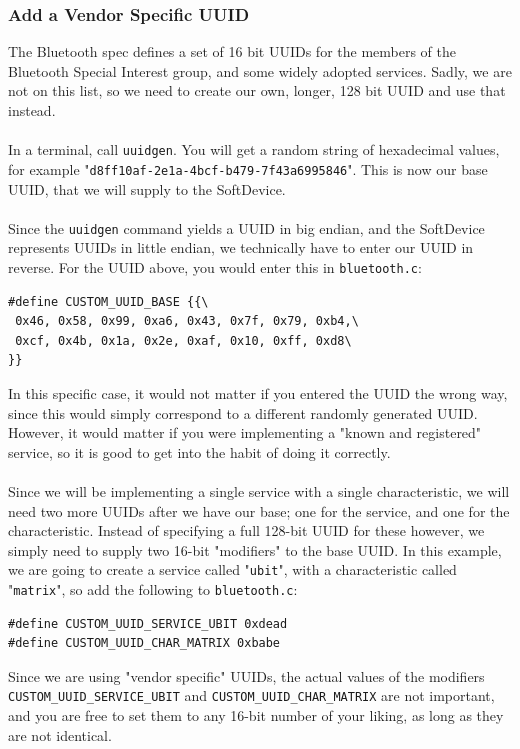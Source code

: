 \documentclass[11pt,a4paper]{article}
\begin{document}
\subsubsection{Add a Vendor Specific UUID}
The Bluetooth spec defines a set of 16 bit UUIDs for the members of the Bluetooth Special Interest group, and some widely adopted services. Sadly, we are not on this list, so we need to create our own, longer, 128 bit UUID and use that instead.\\
\\
In a terminal, call \texttt{uuidgen}. You will get a random string of hexadecimal values, for example "\texttt{d8ff10af-2e1a-4bcf-b479-7f43a6995846}". This is now our base UUID, that we will supply to the SoftDevice.\\
\\
Since the \texttt{uuidgen} command yields a UUID in big endian, and the SoftDevice represents UUIDs in little endian, we technically have to enter our UUID in reverse. For the UUID above, you would enter this in \texttt{bluetooth.c}:
\begin{verbatim}
#define CUSTOM_UUID_BASE {{\
 0x46, 0x58, 0x99, 0xa6, 0x43, 0x7f, 0x79, 0xb4,\
 0xcf, 0x4b, 0x1a, 0x2e, 0xaf, 0x10, 0xff, 0xd8\
}}
\end{verbatim}
In this specific case, it would not matter if you entered the UUID the wrong way, since this would simply correspond to a different randomly generated UUID. However, it would matter if you were implementing a "known and registered" service, so it is good to get into the habit of doing it correctly.\\
\\
Since we will be implementing a single service with a single characteristic, we will need two more UUIDs after we have our base; one for the service, and one for the characteristic. Instead of specifying a full 128-bit UUID for these however, we simply need to supply two 16-bit "modifiers" to the base UUID. In this example, we are going to create a service called "\texttt{ubit}", with a characteristic called "\texttt{matrix}", so add the following to \texttt{bluetooth.c}:
\begin{verbatim}
#define CUSTOM_UUID_SERVICE_UBIT 0xdead
#define CUSTOM_UUID_CHAR_MATRIX 0xbabe
\end{verbatim}
\todo{Change these values?}
Since we are using "vendor specific" UUIDs, the actual values of the modifiers \texttt{CUSTOM_UUID_SERVICE_UBIT} and \texttt{CUSTOM_UUID_CHAR_MATRIX} are not important, and you are free to set them to any 16-bit number of your liking, as long as they are not identical.\\
\end{document}
